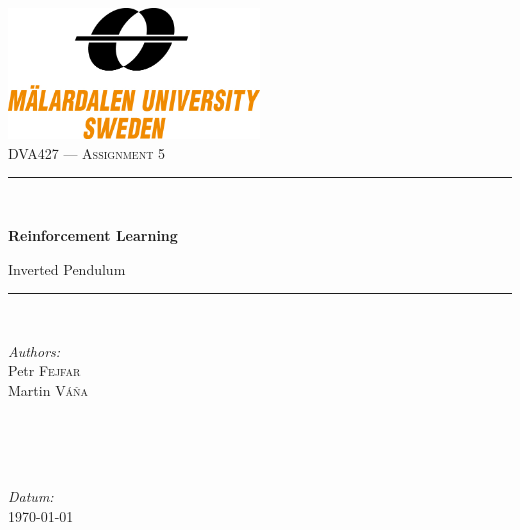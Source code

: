 \documentclass[12pt,a4paper]{article}
\begin{document}

\begin{titlepage}

\newcommand{\HRule}{\rule{\linewidth}{0.5mm}} %

\center %

\includegraphics[width=0.5\textwidth]{mdh_logo}~\\[2cm] %

\textsc{\Large DVA427 --- Assignment 5}\\[0cm]


\HRule \\[0.8cm]
\begin{center}
 \Huge \bfseries Reinforcement Learning\par Inverted Pendulum\\[0.4cm] %
\end{center}
\HRule \\[0.5cm]

\vspace{\fill}

\begin{minipage}{0.4\textwidth}
\begin{flushleft} \large
\emph{Authors:}\\
Petr \textsc{Fejfar}\\[0.2cm] %
Martin \textsc{Váňa}\\[0.2cm] %
\end{flushleft}
\end{minipage}
~
\begin{minipage}{0.4\textwidth}
\begin{flushright} \large
~\\
~\\
\emph{Datum:} \\
\today\\[0.2cm] %
\end{flushright}
\end{minipage}\\

\end{titlepage}
\end{document}
